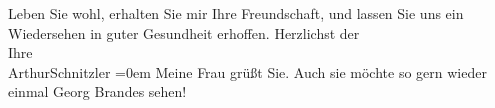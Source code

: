 \begin{ledgroupsized}[t]{13cm}
           \pstart
           Leben Sie wohl, erhalten Sie mir Ihre Freundschaft, und lassen Sie uns ein
                    Wiedersehen in guter Gesundheit erhoffen.\pend
           \pstart
           Herzlichst der{\\[\baselineskip]}Ihre{\\[\baselineskip]}\spacefill\mbox{ArthurSchnitzler}\pend
           \leftskip=0em{}\pstart
           \noindent{}Meine Frau grüßt Sie.
                        Auch sie möchte so gern wieder einmal Georg Brandes sehen!\pend
           
         
         \endnumbering{}\end{ledgroupsized}  \newcommand{\dateiname}{L02035}\newcommand{\titel}{Arthur Schnitzler an Georg Brandes, 12. 10. 1911}\newcommand{\editorInnen}{Martin Anton Müller und Gerd-Hermann Susen}
      